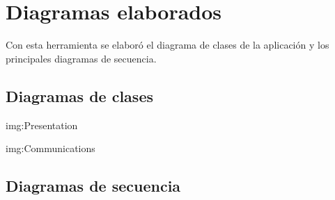 \section{Diagramas elaborados}
Con esta herramienta se elaboró el diagrama de clases de la aplicación y los
principales diagramas de secuencia.

\subsection{Diagramas de clases}

{img:Presentation}


{img:Communications}

\subsection{Diagramas de secuencia}


